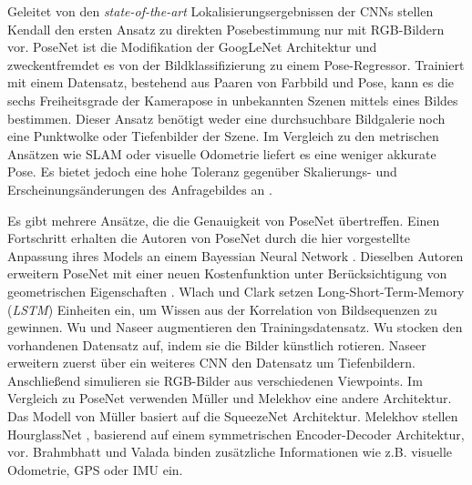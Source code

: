 Geleitet von den \textit{state-of-the-art} Lokalisierungsergebnissen der CNNs stellen Kendall \etal\cite{kendallPoseNetConvolutionalNetwork2015} den ersten Ansatz zu direkten Posebestimmung nur mit RGB-Bildern vor. PoseNet \cite{kendallPoseNetConvolutionalNetwork2015} ist die Modifikation der GoogLeNet \cite{szegedyGoingDeeperConvolutions2015} Architektur und zweckentfremdet es von der Bildklassifizierung zu einem Pose-Regressor. Trainiert mit einem Datensatz, bestehend aus Paaren von Farbbild und Pose, kann es die sechs Freiheitsgrade der Kamerapose in unbekannten Szenen mittels eines Bildes bestimmen. Dieser Ansatz benötigt weder eine durchsuchbare Bildgalerie noch eine Punktwolke oder Tiefenbilder der Szene. Im Vergleich zu den metrischen Ansätzen wie SLAM oder visuelle Odometrie liefert es eine weniger akkurate Pose. Es bietet jedoch eine hohe Toleranz gegenüber Skalierungs- und Erscheinungsänderungen des Anfragebildes an \cite{piascoSurveyVisualBasedLocalization2018}.

Es gibt mehrere Ansätze, die die Genauigkeit von PoseNet  \cite{kendallPoseNetConvolutionalNetwork2015} übertreffen.
Einen Fortschritt erhalten die Autoren von PoseNet \cite{kendallPoseNetConvolutionalNetwork2015} durch die hier \cite{kendallModellingUncertaintyDeep2015a} vorgestellte Anpassung ihres Models an einem Bayessian Neural Network \cite{denkerTransformingNeuralNetOutput1991, mackayPracticalBayesianFramework1991}.
Dieselben Autoren erweitern PoseNet \cite{kendallPoseNetConvolutionalNetwork2015} mit einer neuen Kostenfunktion unter Berücksichtigung von geometrischen Eigenschaften \cite{kendallGeometricLossFunctions2017}. Wlach \etal\cite{walchImagebasedLocalizationUsing2016} und Clark \etal\cite{clarkVidLocDeepSpatioTemporal2017} setzen Long-Short-Term-Memory (\textit{LSTM}) \cite{hochreiterLongShortTermMemory1997a} Einheiten ein, um Wissen aus der Korrelation von Bildsequenzen zu gewinnen. Wu \etal\cite{wuDelvingDeeperConvolutional2017} und Naseer \etal\cite{naseerDeepRegressionMonocular2017} augmentieren den Trainingsdatensatz. Wu \etal\cite{wuDelvingDeeperConvolutional2017} stocken den vorhandenen Datensatz auf, indem sie die Bilder künstlich rotieren. Naseer \etal\cite{naseerDeepRegressionMonocular2017} erweitern zuerst über ein weiteres CNN den Datensatz um Tiefenbildern. Anschließend simulieren sie RGB-Bilder aus verschiedenen Viewpoints. Im Vergleich zu PoseNet  \cite{kendallPoseNetConvolutionalNetwork2015} verwenden Müller \etal\cite{mullerSQUEEZEPOSENETIMAGEBASED2017} und Melekhov \etal\cite{melekhovImageBasedLocalizationUsing2017} eine andere Architektur. 
Das Modell von Müller \etal\cite{mullerSQUEEZEPOSENETIMAGEBASED2017} basiert auf die SqueezeNet \cite{iandolaSqueezeNetAlexNetlevelAccuracy2016} Architektur. Melekhov \etal stellen HourglassNet \cite{melekhovImageBasedLocalizationUsing2017}, basierend auf einem symmetrischen Encoder-Decoder Architektur, vor. Brahmbhatt \etal\cite{brahmbhattGeometryAwareLearningMaps2018} und Valada \etal\cite{valadaDeepAuxiliaryLearning2018, valadaIncorporatingSemanticGeometric} binden zusätzliche Informationen wie z.B. visuelle Odometrie, GPS oder IMU ein. 

